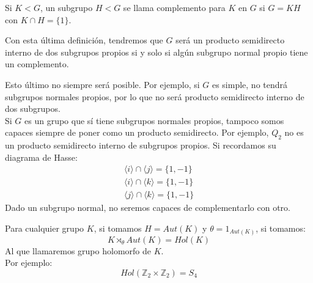 \begin{definicion}
    Si $K<G$, un subgrupo $H<G$ se llama complemento para $K$ en $G$ si $G = KH$ con $K\cap H = \{1\}$.
\end{definicion}

\begin{observacion}
    Con esta última definición, tendremos que $G$ será un producto semidirecto interno de dos subgrupos propios si y solo si algún subgrupo normal propio tiene un complemento.
\end{observacion}

\begin{ejemplo}
    Esto último no siempre será posible. Por ejemplo, si $G$ es simple, no tendrá subgrupos normales propios, por lo que no será producto semidirecto interno de dos subgrupos.\\

    \noindent
    Si $G$ es un grupo que sí tiene subgrupos normales propios, tampoco somos capaces siempre de poner como un producto semidirecto. Por ejemplo, $Q_2$ no es un producto semidirecto interno de subgrupos propios. Si recordamos su diagrama de Hasse: %
    \begin{gather*}
        \langle i \rangle \cap \langle j \rangle  = \{1, -1\} \\
        \langle i \rangle \cap \langle k \rangle  = \{1, -1\} \\
        \langle j \rangle \cap \langle k \rangle  = \{1, -1\} 
    \end{gather*}
    Dado un subgrupo normal, no seremos capaces de complementarlo con otro.
\end{ejemplo}

\begin{ejemplo}
    Para cualquier grupo $K$, si tomamos $H = Aut(K)$ y $\theta = 1_{Aut(K)}$, si tomamos:
    \begin{equation*}
        K\rtimes_\theta Aut(K) = Hol(K)
    \end{equation*}
    Al que llamaremos grupo holomorfo de $K$.\\

    \noindent
    Por ejemplo:
    \begin{equation*}
        Hol(\mathbb{Z}_2\times \mathbb{Z}_2) = S_4
    \end{equation*}
\end{ejemplo}

